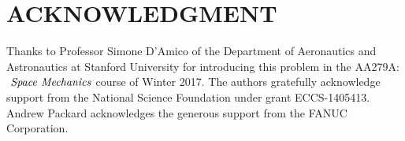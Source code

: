 \documentclass[letterpaper, 10 pt, conference]{ieeeconf}  %
\begin{document}
\addtolength{\textheight}{-12cm}   %






\iffalse
\section*{APPENDIX}

Appendixes should appear before the acknowledgment.
\fi

\section*{ACKNOWLEDGMENT}

Thanks to Professor Simone D'Amico of the Department of Aeronautics and Astronautics at Stanford University for introducing this problem in the AA279A:$\it{\ Space \ Mechanics}$ course of Winter 2017. The authors gratefully acknowledge support from the National Science Foundation under grant ECCS-1405413.  Andrew Packard acknowledges the generous support from the FANUC Corporation.\\

\iffalse
References are important to the reader; therefore, each citation must be complete and correct. If at all possible, references should be commonly available publications.
\fi
\end{document}
